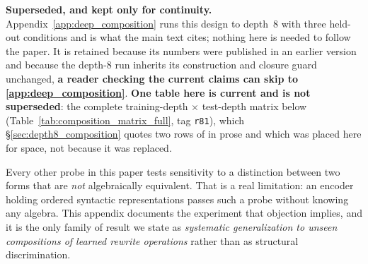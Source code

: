 \noindent\textbf{Superseded, and kept only for continuity.} Appendix~\ref{app:deep_composition} runs
this design to depth~8 with three held-out conditions and is what the main text cites; nothing here is
needed to follow the paper. It is retained because its numbers were published in an earlier version
and because the depth-8 run inherits its construction and closure guard unchanged, \textbf{a reader
checking the current claims can skip to \ref{app:deep_composition}}.
\textbf{One table here is current and is not superseded}: the complete training-depth $\times$ test-depth matrix below (Table~\ref{tab:composition_matrix_full}, tag \texttt{r81}), which \S\ref{sec:depth8_composition} quotes two rows of in prose and which was placed here for space, not because it was replaced.

Every other probe in this paper tests sensitivity to a distinction between two forms that are \emph{not} algebraically equivalent. That is a real limitation: an encoder holding ordered syntactic representations passes such a probe without knowing any algebra. This appendix documents the experiment that objection implies, and it is the only family of result we state as \emph{systematic generalization to unseen compositions of learned rewrite operations} rather than as structural discrimination.

